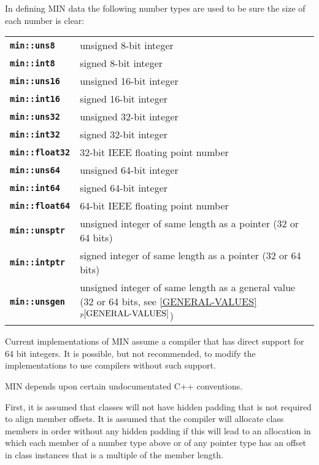 \documentclass[12pt]{article}
\makeatletter
\newcommand{\ttindex}[1]{\index{#1@{\tt #1}}}
\newcommand{\minkey}[1]%
           {{\tt \bf min::#1}\ttindex{min::#1}\ttindex{#1}}
\newcommand{\itemref}[1]{\ref{#1}$^{p\pageref{#1}}$}
\newcommand{\LABEL}[1]{\label{#1}}
\makeatother
\begin{document}
In defining MIN data the following number types are used to be sure
the size of each number is clear:
\begin{center}
\begin{tabular}{l@{~~~~~}p{4.5in}}
\minkey{uns8}	& unsigned 8-bit integer \\
\minkey{int8}	& signed 8-bit integer \\
\minkey{uns16}	& unsigned 16-bit integer \\
\minkey{int16}	& signed 16-bit integer \\
\minkey{uns32}	& unsigned 32-bit integer \\
\minkey{int32}	& signed 32-bit integer \\
\minkey{float32}	& 32-bit IEEE floating point number \\
\minkey{uns64}	& unsigned 64-bit integer \\
\minkey{int64}	& signed 64-bit integer \\
\minkey{float64}	& 64-bit IEEE floating point number \\
\minkey{unsptr}	& unsigned integer of same length as a pointer (32 or 64 bits)
                  \\
\minkey{intptr}	& signed integer of same length as a pointer (32 or 64 bits)
                  \\
\minkey{unsgen}	& unsigned integer of same length as a general value
                  (32 or 64 bits, see \itemref{GENERAL-VALUES})
                  \\
\end{tabular}
\end{center}%
\LABEL{MIN::UNS8}%
\LABEL{MIN::INT8}%
\LABEL{MIN::UNS16}%
\LABEL{MIN::INT16}%
\LABEL{MIN::UNS32}%
\LABEL{MIN::INT32}%
\LABEL{MIN::FLOAT32}%
\LABEL{MIN::UNS64}%
\LABEL{MIN::INT64}%
\LABEL{MIN::FLOAT64}%
\LABEL{MIN::UNSPTR}%
\LABEL{MIN::INTPTR}%
\label{INT}%
\label{UNS}

Current implementations of MIN assume a compiler that has
direct support for 64 bit integers.  It is possible, but not recommended,
to modify the implementations to use compilers without such support.

MIN depends upon certain undocumentated C++ conventions.

First, it is assumed that classes will not have hidden
padding that is not required to align member offsets.
It is assumed that the compiler will allocate class members
in order without any hidden padding if this will lead to
an allocation in which each member of a number type above or
of any pointer type has an offset in class instances
that is a multiple of the member length.
\end{document}

